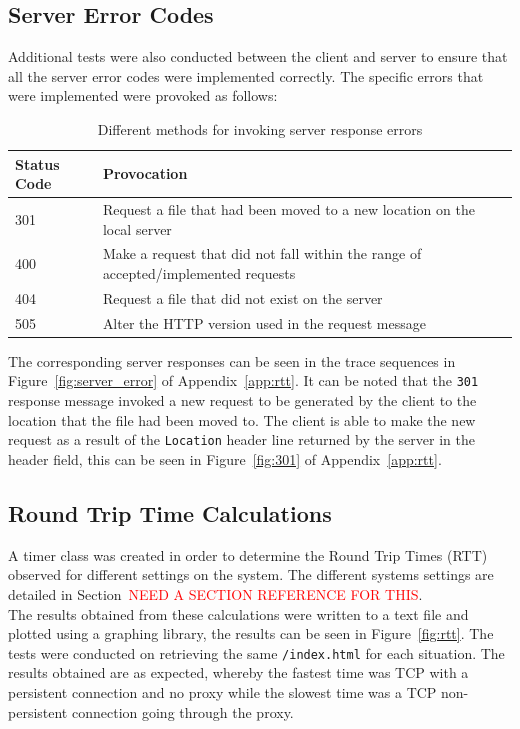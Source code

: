 \documentclass[10pt,twocolumn]{witseiepaper}
\begin{document}
	\subsection{Server Error Codes}
	
		Additional tests were also conducted between the client and server to ensure that all the server error codes were implemented correctly. The specific errors that were implemented were provoked as follows:
		
		\begin{table}[htbp]
			\centering
			\caption{Different methods for invoking server response errors}
			\label{tab:errors_responses}
			\begin{tabular}{p{}| p{}}
				\hline
				\textbf{Status Code} & \textbf{Provocation}\\ \hline
				301 & Request a file that had been moved to a new location on the local server \\
				400 & Make a request that did not fall within the range of accepted/implemented requests \\
				404 & Request a file that did not exist on the server \\
				505 & Alter the HTTP version used in the request message \\
				\hline
			\end{tabular}
		\end{table}
		
		The corresponding server responses can be seen in the trace sequences in Figure~\ref{fig:server_error} of Appendix~\ref{app:rtt}. It can be noted that the \texttt{301} response message invoked a new request to be generated by the client to the location that the file had been moved to. The client is able to make the new request as a result of the \texttt{Location} header line returned by the server in the header field, this can be seen in Figure~\ref{fig:301} of Appendix~\ref{app:rtt}.
	
	\subsection{Round Trip Time Calculations}
	
		A timer class was created in order to determine the Round Trip Times (RTT) observed for different settings on the system. The different systems settings are detailed in Section~\textcolor{red}{NEED A SECTION REFERENCE FOR THIS}. \\
		
		The results obtained from these calculations were written to a text file and plotted using a graphing library, the results can be seen in Figure~\ref{fig:rtt}. The tests were conducted on retrieving the same \texttt{/index.html} for each situation. The results obtained are as expected, whereby the fastest time was TCP with a persistent connection and no proxy while the slowest time was a TCP non-persistent connection going through the proxy. 
		
\end{document}
